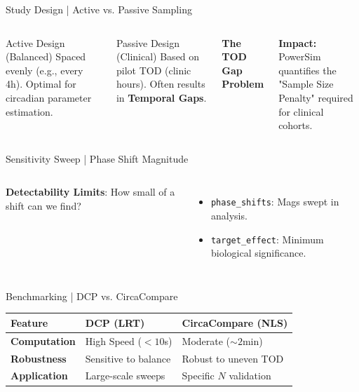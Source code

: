 \documentclass[aspectratio=169,10pt]{beamer}
\begin{document}
\begin{frame}{Study Design | Active vs. Passive Sampling}
\begin{columns}[T]
    \begin{block}{Active Design (Balanced)}
        \scriptsize Spaced evenly (e.g., every 4h). Optimal for circadian parameter estimation.
    \end{block}
    \begin{block}{Passive Design (Clinical)}
        \scriptsize Based on pilot TOD (clinic hours). Often results in \textbf{Temporal Gaps}.
    \end{block}
    \centering \textbf{The TOD Gap Problem}
    
    \scriptsize \textcolor{cbRed}{\textbf{Impact:}} PowerSim quantifies the "Sample Size Penalty" required for clinical cohorts.
\end{columns}
\end{frame}

\begin{frame}{Sensitivity Sweep | Phase Shift Magnitude}
\begin{columns}[c]
    \scriptsize
    \textbf{Detectability Limits}: How small of a shift can we find?\\
    \begin{itemize}
        \item \texttt{phase\_shifts}: Mags swept in analysis.
        \item \texttt{target\_effect}: Minimum biological significance.
    \end{itemize}
\end{columns}
\end{frame}

\begin{frame}{Benchmarking | DCP vs. CircaCompare}
\centering
\scriptsize
\begin{tabular}{lll}
    \toprule
    \textbf{Feature} & \textbf{DCP (LRT)} & \textbf{CircaCompare (NLS)} \\
    \midrule
    \textbf{Computation} & High Speed ($<10$s) & Moderate ($\sim 2$min) \\
    \textbf{Robustness} & Sensitive to balance & Robust to uneven TOD \\
    \textbf{Application} & Large-scale sweeps & Specific $N$ validation \\
    \bottomrule
\end{tabular}
\end{frame}
\end{document}
